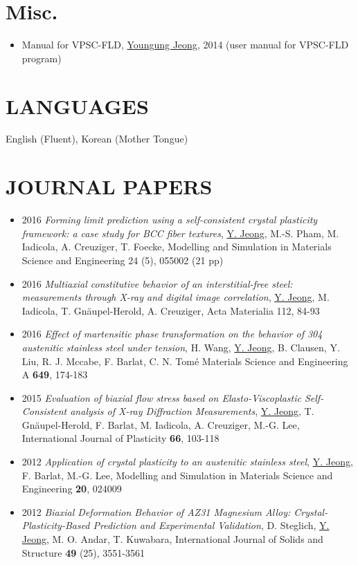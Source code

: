 \documentclass{res}
\begin{document}
\begin{resume}
  \section{Misc.}
  \begin{itemize}
  \item Manual for VPSC-FLD, \underline{Youngung Jeong}, 2014 (user manual for VPSC-FLD program)
  \end{itemize}

  \section{LANGUAGES}
  English (Fluent), Korean (Mother Tongue)

  \section{JOURNAL PAPERS}
  \begin{itemize}
  \item 2016 {\it Forming limit prediction using a self-consistent crystal plasticity framework: a case study for BCC fiber textures}, \underline{Y. Jeong}, M.-S. Pham, M. Iadicola, A. Creuziger, T. Foecke, Modelling and Simulation in Materials Science and Engineering 24 (5), 055002 (21 pp)
  \item 2016 {\it Multiaxial constitutive behavior of an interstitial-free steel: measurements through X-ray and digital image correlation}, \underline{Y. Jeong}, M. Iadicola, T. Gn\"{a}upel-Herold, A. Creuziger, Acta Materialia 112, 84-93
  \item 2016 {\it Effect of martensitic phase transformation on the behavior of 304 austenitic stainless steel under tension}, H. Wang, \underline{Y. Jeong}, B. Clausen, Y. Liu, R. J. Mccabe, F. Barlat, C. N. Tom\'{e} Materials Science and Engineering A {\bf 649}, 174-183
  \item 2015 {\it Evaluation of biaxial flow stress based on Elasto-Viscoplastic Self-Consistent analysis of X-ray Diffraction Measurements}, \underline{Y. Jeong}, T. Gn\"{a}upel-Herold, F. Barlat, M. Iadicola, A. Creuziger, M.-G. Lee, International Journal of Plasticity {\bf 66}, 103-118
  \item 2012 {\it Application of crystal plasticity to an austenitic stainless steel}, \underline{Y. Jeong}, F. Barlat, M.-G. Lee, Modelling and Simulation in Materials Science and Engineering {\bf 20}, 024009
  \item 2012 {\it Biaxial Deformation Behavior of AZ31 Magnesium Alloy: Crystal-Plasticity-Based Prediction and Experimental Validation}, D. Steglich, \underline{Y. Jeong}, M. O. Andar, T. Kuwabara, International Journal of Solids and Structure {\bf 49} (25), 3551-3561
  \end{itemize}


\end{resume}
\end{document}
